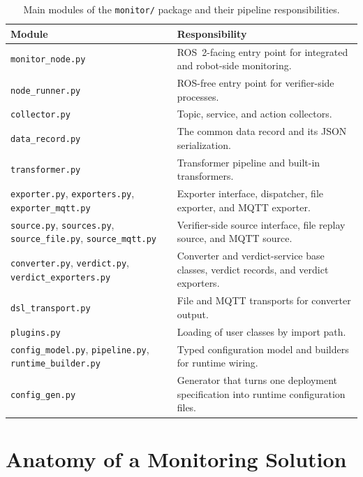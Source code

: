 \begin{table}[htbp]
\centering
\caption{Main modules of the \texttt{monitor/} package and their pipeline
responsibilities.}
\label{tab:impl-modules}
\begin{tabular}{
    >{\raggedright\arraybackslash}p{}
    >{\raggedright\arraybackslash}p{}
}
\toprule
\textbf{Module} & \textbf{Responsibility} \\
\midrule
\texttt{monitor\_node.py} &
ROS~2-facing entry point for integrated and robot-side monitoring. \\
\texttt{node\_runner.py} &
ROS-free entry point for verifier-side processes. \\
\texttt{collector.py} &
Topic, service, and action collectors. \\
\texttt{data\_record.py} &
The common data record and its JSON serialization. \\
\texttt{transformer.py} &
Transformer pipeline and built-in transformers. \\
\texttt{exporter.py}, \texttt{exporters.py},
\texttt{exporter\_mqtt.py} &
Exporter interface, dispatcher, file exporter, and MQTT exporter. \\
\texttt{source.py}, \texttt{sources.py}, \texttt{source\_file.py},
\texttt{source\_mqtt.py} &
Verifier-side source interface, file replay source, and MQTT source. \\
\texttt{converter.py}, \texttt{verdict.py},
\texttt{verdict\_exporters.py} &
Converter and verdict-service base classes, verdict records, and verdict
exporters. \\
\texttt{dsl\_transport.py} &
File and MQTT transports for converter output. \\
\texttt{plugins.py} &
Loading of user classes by import path. \\
\texttt{config\_model.py}, \texttt{pipeline.py},
\texttt{runtime\_builder.py} &
Typed configuration model and builders for runtime wiring. \\
\texttt{config\_gen.py} &
Generator that turns one deployment specification into runtime configuration
files. \\
\bottomrule
\end{tabular}
\end{table}

\section{Anatomy of a Monitoring Solution}

